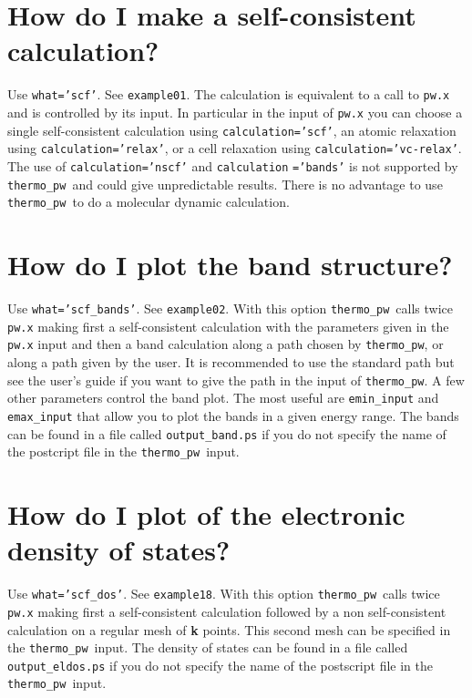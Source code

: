\documentclass[12pt,a4paper]{article}
\def\thermo{\texttt{thermo\_pw}}
\begin{document}
\section{\color{coral}How do I make a self-consistent calculation?}
Use \texttt{what='scf'}. See \texttt{example01}. The calculation is
equivalent to a call to \texttt{pw.x} and is controlled by
its input. In particular in the input of \texttt{pw.x} you can choose
a single self-consistent calculation using \texttt{calculation='scf'}, 
an atomic relaxation using \texttt{calculation='relax'}, or a cell relaxation 
using \texttt{calculation='vc-relax'}.
The use of \texttt{calculation='nscf'} and \texttt{calculation}
\texttt{='bands'} is
not supported by \thermo\ and could give unpredictable results.
There is no advantage to use \thermo\ to do a molecular dynamic
calculation. 

\section{\color{coral}How do I plot the band structure?}
Use \texttt{what='scf\_bands'}. See \texttt{example02}.
With this option \thermo\ calls twice
\texttt{pw.x} making first a self-consistent calculation with the parameters
given in the \texttt{pw.x} input and then a band calculation along a 
path chosen by \thermo, or along a path given by the user. It is recommended
to use the standard path but see the user's guide if you want to give
the path in the input of \thermo. 
A few other parameters control the band plot. The most useful are 
\texttt{emin\_input} and \texttt{emax\_input} that allow you to plot the 
bands in a given energy range. The bands can be found 
in a file called \texttt{output\_band.ps} if you do not specify the name 
of the postcript file in the \thermo\ input.

\section{\color{coral}How do I plot of the electronic density of states?}
Use \texttt{what='scf\_dos'}. See \texttt{example18}. With this option
\thermo\ calls twice \texttt{pw.x} making first a self-consistent calculation
followed by a non self-consistent calculation on a regular mesh of 
{\bf k} points.
This second mesh can be specified in the \thermo\ input. The density of
states can be found in a file called \texttt{output\_eldos.ps} if you do not
specify the name of the postscript file in the \thermo\ input.
\end{document}
